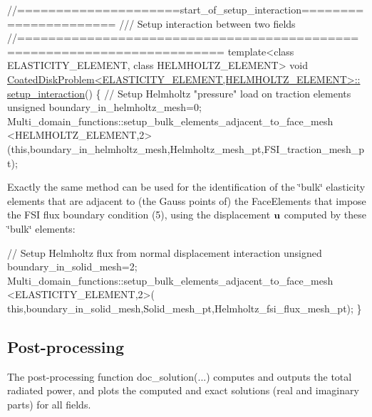 \begin{DoxyCodeInclude}
\textcolor{comment}{//=====================start\_of\_setup\_interaction======================}
\textcolor{comment}{/// Setup interaction between two fields}
\textcolor{comment}{}\textcolor{comment}{//========================================================================}
\textcolor{keyword}{template}<\textcolor{keyword}{class} ELASTICITY\_ELEMENT, \textcolor{keyword}{class} HELMHOLTZ\_ELEMENT>
\textcolor{keywordtype}{void} \hyperlink{classCoatedDiskProblem_ad24d43389155a6a9f2f66faf4b239c26}{CoatedDiskProblem<ELASTICITY\_ELEMENT,HELMHOLTZ\_ELEMENT>::}
\hyperlink{classCoatedDiskProblem_ad24d43389155a6a9f2f66faf4b239c26}{setup\_interaction}()
\{
 \textcolor{comment}{// Setup Helmholtz "pressure" load on traction elements}
 \textcolor{keywordtype}{unsigned} boundary\_in\_helmholtz\_mesh=0;
  Multi\_domain\_functions::setup\_bulk\_elements\_adjacent\_to\_face\_mesh
  <HELMHOLTZ\_ELEMENT,2>
  (\textcolor{keyword}{this},boundary\_in\_helmholtz\_mesh,Helmholtz\_mesh\_pt,FSI\_traction\_mesh\_pt);

\end{DoxyCodeInclude}


Exactly the same method can be used for the identification of the \char`\"{}bulk\char`\"{} elasticity elements that are adjacent to (the Gauss points of) the {\ttfamily Face\+Elements} that impose the F\+SI flux boundary condition (5), using the displacement $ {\bf u} $ computed by these \char`\"{}bulk\char`\"{} elements\+:


\begin{DoxyCodeInclude}

 \textcolor{comment}{// Setup Helmholtz flux from normal displacement interaction}
 \textcolor{keywordtype}{unsigned} boundary\_in\_solid\_mesh=2;
 Multi\_domain\_functions::setup\_bulk\_elements\_adjacent\_to\_face\_mesh
  <ELASTICITY\_ELEMENT,2>(
   \textcolor{keyword}{this},boundary\_in\_solid\_mesh,Solid\_mesh\_pt,Helmholtz\_fsi\_flux\_mesh\_pt);
\}

\end{DoxyCodeInclude}




 

\hypertarget{index_doc}{}\subsection{Post-\/processing}\label{index_doc}
The post-\/processing function {\ttfamily doc\+\_\+solution}(...) computes and outputs the total radiated power, and plots the computed and exact solutions (real and imaginary parts) for all fields.

